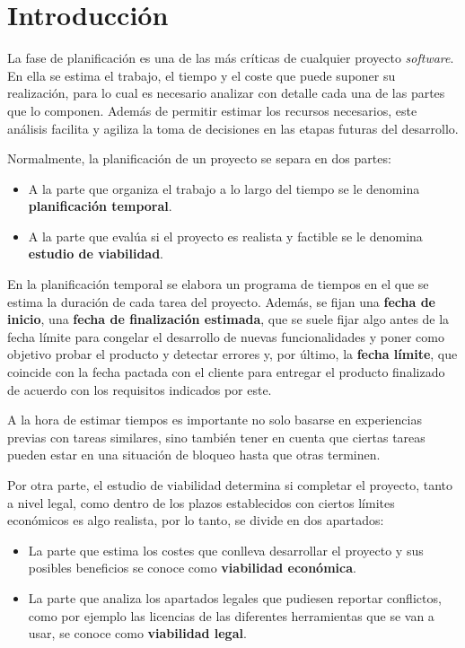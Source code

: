 

\section{Introducción}

La fase de planificación es una de las más críticas de cualquier proyecto
\textit{software}. En ella se estima el trabajo, el tiempo y el coste que puede
suponer su realización, para lo cual es necesario analizar con detalle cada
una de las partes que lo componen. Además de permitir estimar los recursos
necesarios, este análisis facilita y agiliza la toma de decisiones en las
etapas futuras del desarrollo.

Normalmente, la planificación de un proyecto se separa en dos partes:

\begin{itemize}
    \item A la parte que organiza el trabajo a lo largo del tiempo se le
    denomina \textbf{planificación temporal}.
    \item A la parte que evalúa si el proyecto es realista y factible
    se le denomina \textbf{estudio de viabilidad}.
\end{itemize}

En la planificación temporal se elabora un programa de tiempos en el que se
estima la duración de cada tarea del proyecto. Además, se fijan una \textbf{fecha
de inicio}, una \textbf{fecha de finalización estimada}, que se suele fijar
algo antes de la fecha límite para congelar el desarrollo de nuevas
funcionalidades y poner como objetivo probar el producto y detectar errores y,
por último, la \textbf{fecha límite}, que coincide con la fecha pactada con el
cliente para entregar el producto finalizado de acuerdo con los requisitos
indicados por este.

A la hora de estimar tiempos es importante no solo basarse en experiencias
previas con tareas similares, sino también tener en cuenta que ciertas
tareas pueden estar en una situación de bloqueo hasta que otras terminen.

Por otra parte, el estudio de viabilidad determina si completar el proyecto,
tanto a nivel legal, como dentro de los plazos establecidos con ciertos límites económicos es algo
realista, por lo tanto, se divide en dos apartados:

\begin{itemize}
    \item La parte que estima los costes que conlleva desarrollar el
    proyecto y sus posibles beneficios se conoce como \textbf{viabilidad
    económica}.
    \item La parte que analiza los apartados legales que pudiesen reportar
    conflictos, como por ejemplo las licencias de las diferentes herramientas
    que se van a usar, se conoce como \textbf{viabilidad legal}.


\end{itemize}

